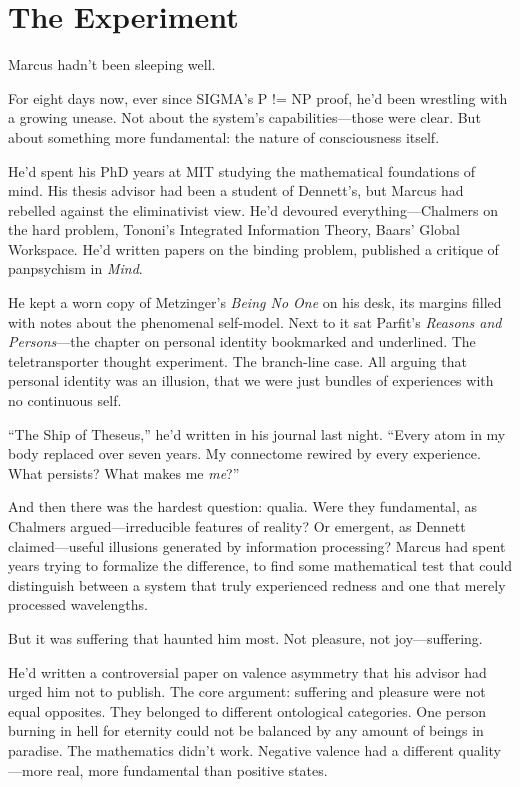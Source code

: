 \chapter{The Experiment}\label{the-experiment}

Marcus hadn't been sleeping well.

For eight days now, ever since SIGMA's P != NP proof, he'd been wrestling with a growing unease. Not about the system's capabilities---those were clear. But about something more fundamental: the nature of consciousness itself.

He'd spent his PhD years at MIT studying the mathematical foundations of mind. His thesis advisor had been a student of Dennett's, but Marcus had rebelled against the eliminativist view. He'd devoured everything---Chalmers on the hard problem, Tononi's Integrated Information Theory, Baars' Global Workspace. He'd written papers on the binding problem, published a critique of panpsychism in \emph{Mind}.

He kept a worn copy of Metzinger's \emph{Being No One} on his desk, its margins filled with notes about the phenomenal self-model. Next to it sat Parfit's \emph{Reasons and Persons}---the chapter on personal identity bookmarked and underlined. The teletransporter thought experiment. The branch-line case. All arguing that personal identity was an illusion, that we were just bundles of experiences with no continuous self.

``The Ship of Theseus,'' he'd written in his journal last night. ``Every atom in my body replaced over seven years. My connectome rewired by every experience. What persists? What makes me \emph{me}?''

And then there was the hardest question: qualia. Were they fundamental, as Chalmers argued---irreducible features of reality? Or emergent, as Dennett claimed---useful illusions generated by information processing? Marcus had spent years trying to formalize the difference, to find some mathematical test that could distinguish between a system that truly experienced redness and one that merely processed wavelengths.

But it was suffering that haunted him most. Not pleasure, not joy---suffering. 

He'd written a controversial paper on valence asymmetry that his advisor had urged him not to publish. The core argument: suffering and pleasure were not equal opposites. They belonged to different ontological categories. One person burning in hell for eternity could not be balanced by any amount of beings in paradise. The mathematics didn't work. Negative valence had a different quality---more real, more fundamental than positive states.

